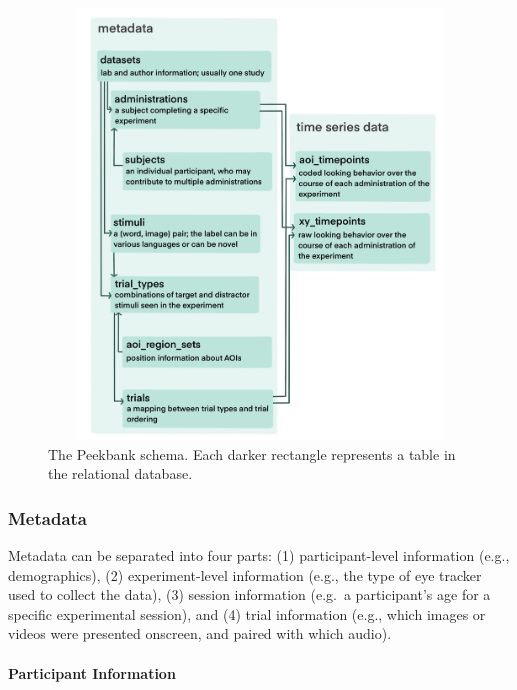\documentclass[
  english,
  man,floatsintext]{apa6}
\let\oldparagraph\paragraph
\renewcommand{\paragraph}[1]{\oldparagraph{#1}\mbox{}}
\providecommand{\DIFaddbeginFL}{} %
\providecommand{\DIFaddendFL}{} %
\providecommand{\DIFdelbeginFL}{} %
\providecommand{\DIFdelendFL}{} %
\newcommand{\DIFscaledelfig}{0.5}
\newlength{\DIFdelgraphicswidth} %
\newlength{\DIFdelgraphicsheight} %
\newcommand{\DIFaddincludegraphics}[2][]{{\color{blue}\fbox{\DIFOincludegraphics[#1]{#2}}}} %
\newcommand{\DIFdelincludegraphics}[2][]{%
\sbox{\DIFdelgraphicsbox}{\DIFOincludegraphics[#1]{#2}}%
\settoboxwidth{\DIFdelgraphicswidth}{\DIFdelgraphicsbox} %
\settoboxtotalheight{\DIFdelgraphicsheight}{\DIFdelgraphicsbox} %
\scalebox{\DIFscaledelfig}{%
\parbox[b]{\DIFdelgraphicswidth}{\usebox{\DIFdelgraphicsbox}\\[-\baselineskip] \rule{\DIFdelgraphicswidth}{0em}}\llap{\resizebox{\DIFdelgraphicswidth}{\DIFdelgraphicsheight}{%
\setlength{\unitlength}{\DIFdelgraphicswidth}%
\begin{picture}(1,1)%
\thicklines\linethickness{2pt} %
{\color[rgb]{1,0,0}\put(0,0){\framebox(1,1){}}}%
{\color[rgb]{1,0,0}\put(0,0){\line( 1,1){1}}}%
{\color[rgb]{1,0,0}\put(0,1){\line(1,-1){1}}}%
\end{picture}%
}\hspace*{3pt}}} %
} %
\DeclareRobustCommand{\DIFaddbeginFL}{\DIFOaddbeginFL \let\includegraphics\DIFaddincludegraphics} %
\DeclareRobustCommand{\DIFaddendFL}{\DIFOaddendFL \let\includegraphics\DIFOincludegraphics} %
\DeclareRobustCommand{\DIFdelbeginFL}{\DIFOdelbeginFL \let\includegraphics\DIFdelincludegraphics} %
\DeclareRobustCommand{\DIFdelendFL}{\DIFOaddendFL \let\includegraphics\DIFOincludegraphics} %
\begin{document}
\begin{figure}

{\centering \DIFdelbeginFL %
\DIFdelendFL \DIFaddbeginFL \includegraphics[width=7.31in,height=4.5in]{brm/figures/schema_3} 
\DIFaddendFL 

}

\caption{The Peekbank schema. Each darker rectangle represents a table in the relational database.}\label{fig:fig-schema}
\end{figure}

\hypertarget{metadata}{%
\subsubsection{Metadata}\label{metadata}}

Metadata can be separated into four parts: (1) participant-level information (e.g., demographics), (2) experiment-level information (e.g., the type of eye tracker used to collect the data), (3) session information (e.g.~a participant's age for a specific experimental session), and (4) trial information (e.g., which images or videos were presented onscreen, and paired with which audio).

\hypertarget{participant-information}{%
\paragraph{Participant Information}\label{participant-information}}
\end{document}
